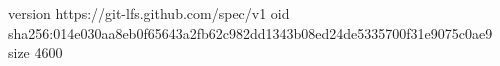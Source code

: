 version https://git-lfs.github.com/spec/v1
oid sha256:014e030aa8eb0f65643a2fb62c982dd1343b08ed24de5335700f31e9075c0ae9
size 4600
